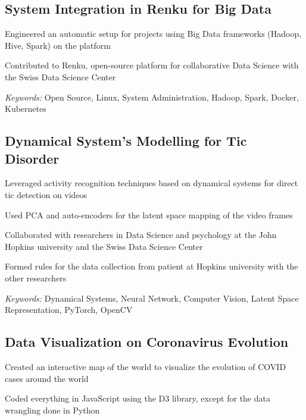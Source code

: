 \subsection{System Integration in Renku for Big Data}
\begin{zitemize}
\item Engineered an automatic setup for projects using Big Data frameworks (Hadoop, Hive, Spark) on the platform
\item Contributed to Renku, open-source platform for collaborative Data Science with the Swiss Data Science Center
\end{zitemize}
\vspace{-0.35\baselineskip}
\textit{Keywords:} Open Source, Linux, System Administration, Hadoop, Spark, Docker, Kubernetes
\vspace{0.35\baselineskip}

\subsection{Dynamical System's Modelling for Tic Disorder}
\begin{zitemize}
\item Leveraged activity recognition techniques based on dynamical systems for direct tic detection on videos
\item Used PCA and auto-encoders for the latent space mapping of the video frames
\item Collaborated with researchers in Data Science and psychology at the John Hopkins university and the Swiss Data
	Science Center
\item Formed rules for the data collection from patient at Hopkins university with the other researchers
\end{zitemize}
\vspace{-0.35\baselineskip}
\textit{Keywords:} Dynamical Systems, Neural Network, Computer Vision, Latent Space Representation, PyTorch, OpenCV
\vspace{0.35\baselineskip}

\subsection{Data Visualization on Coronavirus Evolution}
\begin{zitemize}
\item Created an interactive map of the world to visualize the evolution of COVID cases around the world
\item Coded everything in JavaScript using the D3 library, except for the data wrangling done in Python
\end{zitemize}

